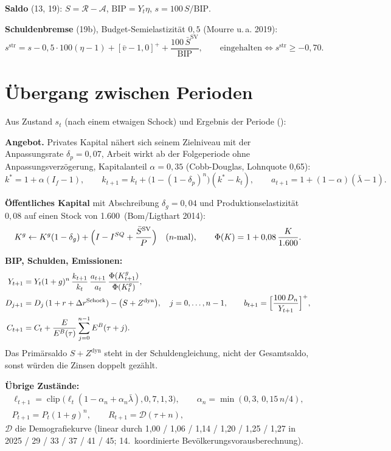 \textbf{Saldo} (13, 19): $S=\mathcal R-\mathcal A$, $\text{BIP}=Y_t\eta$, $s=100\,S/\text{BIP}$.

\textbf{Schuldenbremse} (19b), Budget-Semielastizität $0{,}5$ (Mourre u.\,a. 2019):
\begin{equation}
s^{\text{str}}=s-0{,}5\cdot100(\eta-1)+[\bar v-1{,}0]^++\frac{100\,\bar S^{\text{SV}}}{\text{BIP}},\qquad
\text{eingehalten}\iff s^{\text{str}}\ge-0{,}70.
\end{equation}

\section{Übergang zwischen Perioden}
\label{sec:uebergang}

Aus Zustand $s_t$ (nach einem etwaigen Schock) und Ergebnis der Periode ():

\textbf{Angebot.} Privates Kapital nähert sich seinem Zielniveau mit der Anpassungsrate
$\delta_p=0{,}07$, Arbeit wirkt ab der Folgeperiode ohne Anpassungsverzögerung, Kapitalanteil $\alpha=0{,}35$ (Cobb-Douglas, Lohnquote
0,65):
\begin{equation}
k^*=1+\alpha(I_f-1),\qquad k_{t+1}=k_t+\bigl(1-(1-\delta_p)^n\bigr)(k^*-k_t),\qquad
a_{t+1}=1+(1-\alpha)(\bar\lambda-1).
\end{equation}

\textbf{Öffentliches Kapital} mit Abschreibung $\delta_g=0{,}04$ und Produktionselastizität
$0{,}08$ auf einen Stock von 1.600\,\Mrd{} (Bom/Ligthart 2014):
\begin{equation}
K^g\leftarrow K^g(1-\delta_g)+\Bigl(I-I^{SQ}+\frac{\bar S^{\text{SV}}}{P}\Bigr)\quad(n\text{-mal}),\qquad
\Phi(K)=1+0{,}08\,\frac{K}{1.600}.
\end{equation}

\textbf{BIP, Schulden, Emissionen:}
\begin{align}
Y_{t+1}&=Y_t(1+g)^n\,\frac{k_{t+1}}{k_t}\,\frac{a_{t+1}}{a_t}\,\frac{\Phi(K^g_{t+1})}{\Phi(K^g_t)},\\
D_{j+1}&=D_j\,(1+r+\Delta r^{\text{Schock}})-\bigl(S+Z^{\text{dyn}}\bigr),\quad j=0,\dots,n-1,\qquad
b_{t+1}=\Bigl[\frac{100\,D_n}{Y_{t+1}}\Bigr]^+,\\
C_{t+1}&=C_t+\frac{E}{E^B(\tau)}\sum_{j=0}^{n-1}E^B(\tau+j).
\end{align}
Das Primärsaldo $S+Z^{\text{dyn}}$ steht in der Schuldengleichung, nicht der Gesamtsaldo,
sonst würden die Zinsen doppelt gezählt.

\textbf{Übrige Zustände:}
\begin{gather}
\ell_{t+1}=\operatorname{clip}\bigl(\ell_t(1-\alpha_n+\alpha_n\bar\lambda),0{,}7,1{,}3\bigr),\qquad \alpha_n=\min(0{,}3,\,0{,}15\,n/4),\\
P_{t+1}=P_t(1+g)^n,\qquad R_{t+1}=\mathcal D(\tau+n),
\end{gather}
$\mathcal D$ die Demografiekurve (linear durch 1,00 / 1,06 / 1,14 / 1,20 / 1,25 / 1,27 in
2025 / 29 / 33 / 37 / 41 / 45; 14.\ koordinierte Bevölkerungsvorausberechnung).

